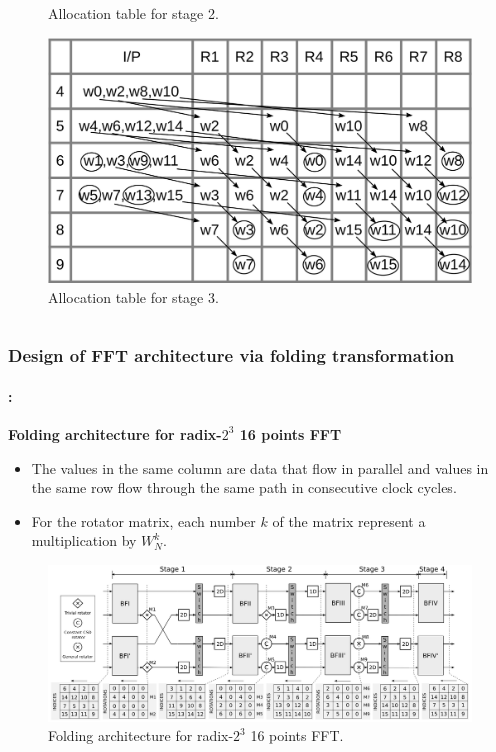\begin{frame}
\begin{columns}[t,onlytextwidth]
\begin{column}{0.45\linewidth}
\begin{figure}[h!]
	    		\caption{\footnotesize Allocation table for stage 2.}
	    	\end{figure}
	    	\vspace{-0.75cm}
	    	\begin{figure}[h!] \centering
	    		\includegraphics[height=0.30\paperheight]{./image/tab-life-c.png}
	    		\caption{\footnotesize Allocation table for stage 3.}
	    	\end{figure}  
   		\end{column}
	\end{columns}
\end{frame}

\begin{frame}
	\frametitle{\textbf{Design of FFT architecture via folding transformation}}
	\framesubtitle{\secname : \subsecname}
	\begin{block}{\centering \textbf{Folding architecture for radix-$2^3$ 16 points FFT}}
		\begin{itemize}\justifying\footnotesize
        	\item The values in the same column are data that flow in parallel and values in the same row flow through the same path in consecutive clock cycles. 
			\item For the rotator matrix, each number $k$ of the matrix represent a multiplication by $W^k_N$.
       	\end{itemize}
	\end{block}
		\vspace{-0.15cm}
		\begin{figure}[h!] \centering
		   	\includegraphics[width=0.875\paperwidth]{./image/folding-16.png}
		    \vspace{-0.15cm}
		    \caption{ \tiny Folding architecture for radix-$2^3$ 16 points FFT.}
		\end{figure}  
\end{frame}


